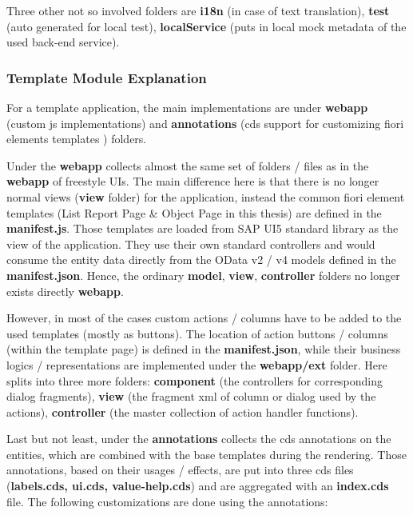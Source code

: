 Three other not so involved folders are \textbf{i18n} (in case of text translation), \textbf{test} (auto generated for local test), \textbf{localService} (puts in local mock metadata of the used back-end service).

\subsubsection{Template Module Explanation}

For a template application, the main implementations are under \textbf{webapp} (custom js implementations) and \textbf{annotations} (cds support for customizing fiori elements templates \cite{fiori-showcase}\cite{fiori-design}\cite{fiori-toolkit}) folders.

\bigskip
Under the \textbf{webapp} collects almost the same set of folders / files as in the \textbf{webapp} of freestyle UIs. The main difference here is that there is no longer normal views (\textbf{view} folder) for the application, instead the common fiori element templates (List Report Page \& Object Page in this thesis) are defined in the \textbf{manifest.js}. Those templates are loaded from SAP UI5 standard library as the view of the application. They use their own standard controllers and would consume the entity data directly from the OData v2 / v4 models defined in the \textbf{manifest.json}. Hence, the ordinary \textbf{model}, \textbf{view}, \textbf{controller} folders no longer exists directly \textbf{webapp}.

However, in most of the cases custom actions / columns have to be added to the used templates (mostly as buttons). The location of action buttons / columns (within the template page) is defined in the \textbf{manifest.json}, while their business logics / representations are implemented under the \textbf{webapp/ext} folder. Here splits into three more folders: \textbf{component} (the controllers for corresponding dialog fragments), \textbf{view} (the fragment xml of column or dialog used by the actions), \textbf{controller} (the master collection of action handler functions).

\bigskip
Last but not least, under the \textbf{annotations} collects the cds annotations on the entities, which are combined with the base templates during the rendering.
Those annotations, based on their usages / effects, are put into three cds files (\textbf{labels.cds, ui.cds, value-help.cds}) and are aggregated with an \textbf{index.cds} file.
The following customizations are done using the annotations:

